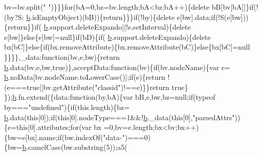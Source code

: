 \begin{DoxyCode}
      bv=bv.split(\textcolor{stringliteral}{" "})\}\}\}\textcolor{keywordflow}{for}(bA=0,bz=bv.length;bA<bz;bA++)\{\textcolor{keyword}{delete} bB[bv[bA]]\}\textcolor{keywordflow}{if}(!(by?S:
      \hyperlink{docs_2_programmer's_manual_2html_2jquery_8js_aa4026ad5544b958e54ce5e106fa1c805}{b}.isEmptyObject)(bB))\{\textcolor{keywordflow}{return}\}\}\}\textcolor{keywordflow}{if}(!by)\{\textcolor{keyword}{delete} e[bw].data;\textcolor{keywordflow}{if}(!S(e[bw]))\{\textcolor{keywordflow}{return}\}\}\textcolor{keywordflow}{if}(
      \hyperlink{docs_2_programmer's_manual_2html_2jquery_8js_aa4026ad5544b958e54ce5e106fa1c805}{b}.support.deleteExpando||!e.setInterval)\{\textcolor{keyword}{delete} e[bw]\}\textcolor{keywordflow}{else}\{e[bw]=null\}\textcolor{keywordflow}{if}(bD)\{\textcolor{keywordflow}{if}(
      \hyperlink{docs_2_programmer's_manual_2html_2jquery_8js_aa4026ad5544b958e54ce5e106fa1c805}{b}.support.deleteExpando)\{\textcolor{keyword}{delete} bx[bC]\}\textcolor{keywordflow}{else}\{\textcolor{keywordflow}{if}(bx.removeAttribute)\{bx.removeAttribute(bC)\}\textcolor{keywordflow}{else}\{bx[bC]=null
      \}\}\}\},\_data:\textcolor{keyword}{function}(bv,e,bw)\{\textcolor{keywordflow}{return} \hyperlink{docs_2_programmer's_manual_2html_2jquery_8js_aa4026ad5544b958e54ce5e106fa1c805}{b}.data(bv,e,bw,\textcolor{keyword}{true})\},acceptData:\textcolor{keyword}{function}(bv)\{\textcolor{keywordflow}{if}(bv.nodeName)\{var e=
      \hyperlink{docs_2_programmer's_manual_2html_2jquery_8js_aa4026ad5544b958e54ce5e106fa1c805}{b}.noData[bv.nodeName.toLowerCase()];\textcolor{keywordflow}{if}(e)\{\textcolor{keywordflow}{return} !(e===\textcolor{keyword}{true}||bv.getAttribute(\textcolor{stringliteral}{"classid"})!==e)\}\}\textcolor{keywordflow}{return} \textcolor{keyword}{true}\}
      \});\hyperlink{docs_2_programmer's_manual_2html_2jquery_8js_aa4026ad5544b958e54ce5e106fa1c805}{b}.fn.extend(\{data:\textcolor{keyword}{function}(by,bA)\{var bB,e,bw,bz=null;\textcolor{keywordflow}{if}(typeof by===\textcolor{stringliteral}{"undefined"})\{\textcolor{keywordflow}{if}(this.length)\{bz=
      \hyperlink{docs_2_programmer's_manual_2html_2jquery_8js_aa4026ad5544b958e54ce5e106fa1c805}{b}.data(\textcolor{keyword}{this}[0]);\textcolor{keywordflow}{if}(\textcolor{keyword}{this}[0].nodeType===1&&!\hyperlink{docs_2_programmer's_manual_2html_2jquery_8js_aa4026ad5544b958e54ce5e106fa1c805}{b}.\_data(\textcolor{keyword}{this}[0],\textcolor{stringliteral}{"parsedAttrs"}))\{e=\textcolor{keyword}{this}[0].attributes;\textcolor{keywordflow}{for}(var bx
      =0,bv=e.length;bx<bv;bx++)\{bw=e[bx].name;\textcolor{keywordflow}{if}(bw.indexOf(\textcolor{stringliteral}{"data-"})===0)\{bw=\hyperlink{docs_2_programmer's_manual_2html_2jquery_8js_aa4026ad5544b958e54ce5e106fa1c805}{b}.camelCase(bw.substring(5));a5(\textcolor{keyword}{
}
\end{DoxyCode}
